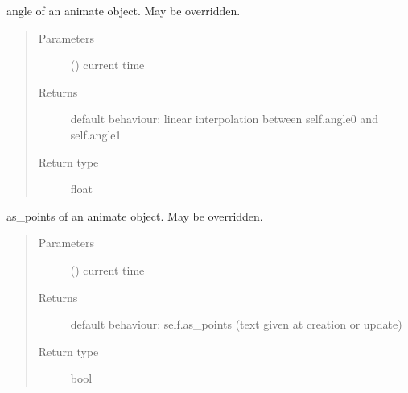 \documentclass[letterpaper,10pt,english]{sphinxmanual}
\begin{document}
\begin{fulllineitems}

\begin{fulllineitems}
\label{\detokenize{Reference:salabim.Animate.angle}}
angle of an animate object. May be overridden.
\begin{quote}\begin{description}
\item[{Parameters}] \leavevmode
{} () \textendash{} current time

\item[{Returns}] \leavevmode
{} \textendash{} default behaviour: linear interpolation between self.angle0 and self.angle1

\item[{Return type}] \leavevmode
float

\end{description}\end{quote}

\end{fulllineitems}


\begin{fulllineitems}
\label{\detokenize{Reference:salabim.Animate.as_points}}
as\_points of an animate object. May be overridden.
\begin{quote}\begin{description}
\item[{Parameters}] \leavevmode
{} () \textendash{} current time

\item[{Returns}] \leavevmode
{} \textendash{} default behaviour: self.as\_points (text given at creation or update)

\item[{Return type}] \leavevmode
bool

\end{description}\end{quote}

\end{fulllineitems}



\end{fulllineitems}
\end{document}
